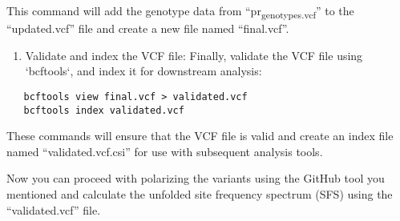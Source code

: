 \documentclass[11pt]{article}
\begin{document}
This command will add the genotype data from ``pr\textsubscript{genotypes.vcf}'' to the ``updated.vcf'' file and create a new file named ``final.vcf''.

\begin{enumerate}
\item Validate and index the VCF file: Finally, validate the VCF file using `bcftools`, and index it for downstream analysis:
\end{enumerate}

\begin{verbatim}
   bcftools view final.vcf > validated.vcf
   bcftools index validated.vcf
\end{verbatim}

These commands will ensure that the VCF file is valid and create an index file named ``validated.vcf.csi'' for use with subsequent analysis tools.

Now you can proceed with polarizing the variants using the GitHub tool you mentioned and calculate the unfolded site frequency spectrum (SFS) using the ``validated.vcf'' file.
\end{document}
